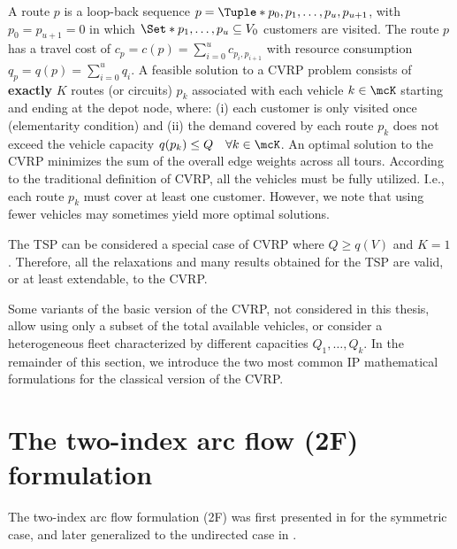 A route $p$ is a loop-back sequence $p = \Tuple*{p_0, p_1, \dots, p_u, p_{u + 1}}$,
with $p_0 = p_{u + 1} = 0$
in which $\Set*{p_1, \dots, p_u} \subseteq V_0$ customers are visited.
The route $p$ has a travel cost of $c_p = c(p) = \sum_{i=0}^{u} c_{p_i,p_{i+1}}$
with resource consumption $q_p = q(p) = \sum_{i=0}^{u} q_{i}$.
A feasible solution to a CVRP problem consists of \textbf{exactly} $K$ routes (or circuits) $p_k$
associated with each vehicle $k \in \mcK$ starting and ending at the depot node,
where:
(i) each customer is only visited once (elementarity condition)
and (ii) the demand covered by each route $p_k$ does not exceed the vehicle capacity $q(p_k) \le Q \quad \forall k \in \mcK$.
An optimal solution to the CVRP minimizes the sum of the overall edge weights across all tours.
According to the traditional definition of CVRP, all the vehicles must be fully utilized.
I.e., each route $p_k$ must cover at least one customer.
However, we note that using fewer vehicles may sometimes yield more optimal solutions.

\medskip

The TSP can be considered a special case of CVRP where $Q \ge q(V)$ and $K = 1$.
Therefore, all the relaxations and many results obtained for the TSP are valid, or at least extendable, to the CVRP.

\medskip

Some variants of the basic version of the CVRP,
not considered in this thesis,
allow using only a subset of the total available vehicles,
or consider a heterogeneous fleet characterized by different capacities $Q_1, \dots, Q_k$.
In the remainder of this section,
we introduce the two most common IP mathematical formulations for the classical version of the CVRP.

\section{The two-index arc flow (2F) formulation}
\label{sec:cvrp-two-index-flow-formulation}

The two-index arc flow formulation (2F)
was  first presented in \textcite{laporte1983, laporte1985} for the symmetric case,
and later generalized to the undirected case in \textcite{laporte1986}.

